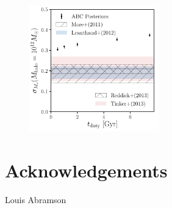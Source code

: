 \documentclass[12pt, letterpaper, preprint]{aastex}
\begin{document}
\begin{figure}
\begin{center}
\includegraphics[width=0.5\textwidth]{figs/sigMstar_tduty.pdf}
\caption{}
\label{fig:abc_demo}
\end{center}
\end{figure}

\section*{Acknowledgements}
Louis Abramson



\end{document}
